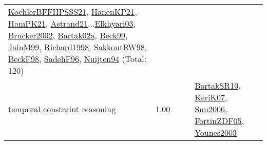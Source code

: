 {\begin{longtable}{p{3cm}r>{\raggedright\arraybackslash}p{6cm}>{\raggedright\arraybackslash}p{6cm}>{\raggedright\arraybackslash}p{8cm}}
\hyperref[detail:KoehlerBFFHPSSS21]{KoehlerBFFHPSSS21}, \hyperref[detail:HanenKP21]{HanenKP21}, \hyperref[detail:HamPK21]{HamPK21}, \hyperref[detail:Astrand21]{Astrand21}...\hyperref[detail:Elkhyari03]{Elkhyari03}, \hyperref[detail:Brucker2002]{Brucker2002}, \hyperref[detail:Bartak02a]{Bartak02a}, \hyperref[detail:Beck99]{Beck99}, \hyperref[detail:JainM99]{JainM99}, \hyperref[detail:Richard1998]{Richard1998}, \hyperref[detail:SakkoutRW98]{SakkoutRW98}, \hyperref[detail:BeckF98]{BeckF98}, \hyperref[detail:SadehF96]{SadehF96}, \hyperref[detail:Nuijten94]{Nuijten94} (Total: 120)\\
\index{temporal constraint reasoning}\index{Concepts!temporal constraint reasoning}temporal constraint reasoning &  1.00 &  &  & \hyperref[detail:BartakSR10]{BartakSR10}, \hyperref[detail:KeriK07]{KeriK07}, \hyperref[detail:Sun2006]{Sun2006}, \hyperref[detail:FortinZDF05]{FortinZDF05}, \hyperref[detail:Younes2003]{Younes2003}\\

\end{longtable}}
